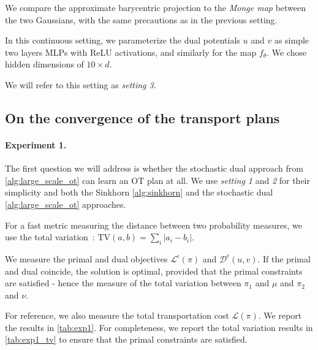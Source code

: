 \documentclass[a4paper,11pt]{article}
\newcommand{\1}{\mathbbm{1}}
\newcommand{\abs}[1]{\left|#1\right|}
\begin{document}
We compare the approximate barycentric projection to the \emph{Monge map} between the two Gaussians, with the same precautions as in the previous setting.

In this continuous setting, we parameterize the dual potentials $u$ and $v$ as simple two layers MLPs with ReLU activations, and similarly for the map $f_{\theta}$. We chose hidden dimensions of $10 \times d$.

We will refer to this setting as \emph{setting 3}.

\subsection{On the convergence of the transport plans}
\label{sec:convergence_transport_plans}

\paragraph{Experiment 1.}The first question we will address is whether the stochastic dual approach from \cref{alg:large_scale_ot} can learn an OT plan at all. We use \emph{setting 1} and \emph{2} for their simplicity and both the Sinkhorn \cref{alg:sinkhorn} and the stochastic dual \cref{alg:large_scale_ot} approaches.

For a fast metric measuring the distance between two probability measures, we use the total variation~: $\mathrm{TV}(a, b) = \sum\limits_{i} \abs{a_i - b_i}$. 

We measure the primal and dual objectives $\mathcal{L}^{\epsilon}(\pi)$ and $\mathcal{D}^{\epsilon}(u, v)$. If the primal and dual coincide, the solution is optimal, provided that the primal constraints are satisfied - hence the measure of the total variation between $\pi_1$ and $\mu$ and $\pi_2$ and $\nu$.

For reference, we also measure the total transportation cost $\mathcal{L}(\pi)$. We report the results in \cref{tab:exp1}. For completeness, we report the total variation results in \cref{tab:exp1_tv} to ensure that the primal constraints are satisfied.
\end{document}
